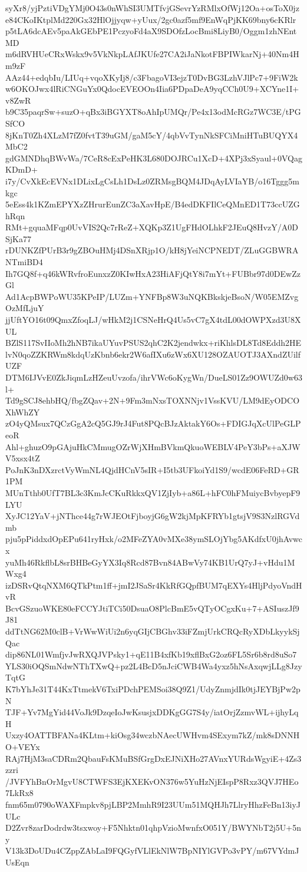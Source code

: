 syXr8/yjPztiVDgYMj0O43s0nWhSI3UMTfvjGSevrYzRMlxOfWj12Oa+osToX0jz
e84CKoIKtplMd220Gx32HlOjjyqw+yUux/2gc0azf5mf9EnWqPjKK69bny6cKRlr
p5tLA6dcAEv5paAkGEbPE1PczyoFd4aX9SDOfzLocBmi8LiyB0/Oggm1zhNEntMD
m6dRVHUeCRxWskx9v5VkNkpLAfJKUfe27CA2iJaNkotFBPIWkarNj+40Nm4Hm9zF
AAz44+edqbIu/LIUq+vqoXKyIj8/c3FbagoVI3ejzT0DvBG3LzhVJlPc7+9FiW2k
w6OKOJwx4lRiCNGuYx0QdocEVEOOn4Iia6PDpaDeA9yqCCh0U9+XCYne1I+v8ZwR
b9C35paqrSw+suzO+qBx3iBGYXT8oAhIpUMQr/Pe4x13odMcRGz7WC3E/tPGSfCO
8jKnT0Zh4XLzM7fZ0fvtT39uGM/gaM5cY/4qbVvTynNkSFCiMniHTuBUQYX4MbC2
gdGMNDhqBWvWa/7CeR8cExPeHK3L680DOJRCu1XcD+4XPj3xSyaul+0VQagKDmD+
i7y/CvXkEcEVNx1DLixLgCsLh1DsLz0ZRMsgBQM4JDqAyLVIaYB/o16Tggg5mkgc
5eEss4k1KZmEPYXzZHrurEunZC3aXavHpE/B4edDKFIlCeQMnED1T73ccUZGhRqn
RMt+gquaMFqp0UvVIS2Qc7rReZ+XQKp3Z1UgFHdOLhkF2JEuQ8HvzY/A0DSjKa77
rDUNKZfPUrB3r9gZBOuHMj4DSnXRjp1O/kH8jYeiNCPNEDT/ZLuGGBWRANTmiBD4
Ih7GQ8f+q46kWRvfroEunxzZ0KIwHxA23HiAFjQtY8i7mYt+FUBbr97d0DEwZzGl
Ad1AcpBWPoWU35KPeIP/LUZm+YNFBp8W3uNQKBkskjeBsoN/W05EMZvgOzMfLjuY
jjUftYO16t09QmxZfoqLJ/wHkM2j1CSNeHrQ4Us5vC7gX4tdL00dOWPXzd3U8XUL
BZlS117SvIIoMh2hNB7ikaUYuvPSUS2qhC2K2jendwkx+riKhlsDL8Td8Eddh2HE
lvN0qoZZKRWm8kdqUzKbnb6ekr2W6afIXu6zWx6XU128OZAUOTJ3AXndZUilfUZF
DTM6IJVvE0ZkJiqmLzHZeuUvzofa/ihrVWc6oKygWn/DueLS01Zz9OWUZd0w63l+
Td9gSCJ8ehbHQ/fbgZQav+2N+9Fm3mNxsTOXNNjv1VssKVU/LM9dEyODCOXhWhZY
zO4yQMsux7QCzGgA2cQ5GJ9rJ4Fut8PQcBJzAktakY6Os+FDIGJqXcUlPeGLPeoR
Ahl+ghuzO9pGAjuHkCMmugOZrWjXHmBVkmQkuoWEBLV4PeY3bPs+aXJWV5xsx4tZ
PoJnK3nDXzrctVyWmNL4QjdHCnV5sIR+I5tb3UFkoiYd1S9/wcdE06FeRD+GR1PM
MUnTthb0UfT7BL3c3KmJcCKuRkkxQV1ZjIyb+a86L+hFC0hFMuiycBvbyepF9LYU
XyJC12YaV+jNThce44g7rWJEOtFjboyjG6gW2kjMpKFRYb1gtsjV9S3NzlRGVdmb
pju5pPiddxdOpEPu641ryHxk/o2MFeZYA0vMXe38ymSLOjYbg5AKdfxU0jhAvwcx
yuMh46RkflbL8srBHBeGyYX3Iq8Rcd87Bvn84ABwVy74KB1UrQ7yJ+vHdu1MWxg4
izDSRvQtqNXM6QTkPtm1ff+jmI2JSaSr4KkRfGQpfBUM7qEXYs4HljPdyoVndHvR
BcvGSzuoWKE80eFCCYJtiTCi50DsuaO8PlcBmE5vQTyOCgxKu+7+ASIuszJf9J81
ddTtNG62M0clB+VrWwWiUi2n6yqGIjCBGhv33iFZmjUrkCRQcRyXDbLkyykSjQac
dip86NL01WmfjvJwRXQJVPsky1+qE11B4xfKb19xflBxG2oz6FL5Sr6b8rd8uSo7
YLS30iOQSmNdwNThTXwQ+pz2L4BcD5nJciCWB4Wa4yxz5hNsAxqwjLLg8JzyTqtG
K7bYhJe31T44KxTtmekV6TxiPDchPEMSoi38Q9Z1/UdyZnmjdIk0tjJEYBjPw2pN
TJF+Yv7MgYid44VoJk9DzqeIoJwKsusjxDDKgGG7S4y/iatOrjZzmvWL+ijhyLqH
Uxzy4OATTBFANa4KLtm+kiOsg34wczbNAecUWHvm4SExym7kZ/mk8sDNNHO+VEYx
RAj7HjM3saCDRm2QbauFsKMuBSfGrgDxEJNiXHo27AVnxYURdsWgyiE+4Zs3zzri
/JVFYhBnOrMgvU8CTWFS3EjKXEKvON376w5YuHzNjEIspP8Rxz3QVJ7HEo7LkRx8
fnm65m0790oWAXFmpkv8pjLBP2MmhR9I23UUm51MQHJh7LlryHhzFeBn13iyJULc
D2Zvr8zarDodrdw3tsxwoy+F5Nhktn01qhpVzioMwnfxO051Y/BWYNbT2j5U+5ny
V13k3DoUDu4CZppZAbLaI9FQGyfVLlEkNlW7BpNIYlGVPo3vPY/m67VYdmJUsEqn
